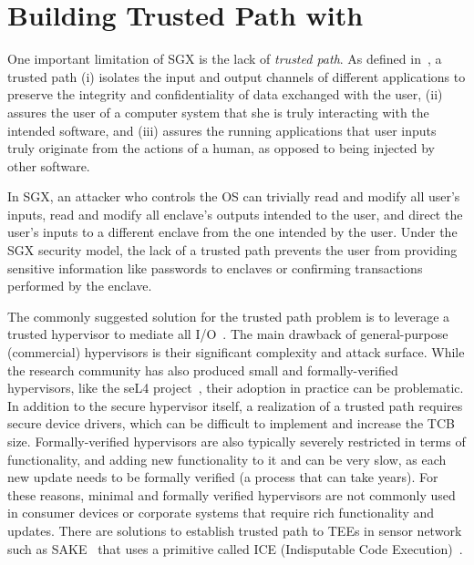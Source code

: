 \section{Building Trusted Path with \name}
\label{sec:secureInput}

 
One important limitation of SGX is the lack of \emph{trusted path}. As defined in~\cite{filyanov2011uni}, a trusted path (i) isolates the input and output channels of different applications to preserve the integrity and confidentiality of data exchanged with the user, (ii) assures the user of a computer system that she is truly interacting with the intended software, and (iii) assures the running applications that user inputs truly originate from the actions of a human, as opposed to being injected by other software.

In SGX, an attacker who controls the OS can trivially read and modify all user's inputs, read and modify all enclave's outputs intended to the user, and direct the user's inputs to a different enclave from the one intended by the user. Under the SGX security model, the lack of a trusted path prevents the user from providing sensitive information like passwords to enclaves or confirming transactions performed by the enclave.



The commonly suggested solution for the trusted path problem is to leverage a trusted hypervisor to mediate all I/O~\cite{weiser2017sgxio}. The main drawback of general-purpose (commercial) hypervisors is their significant complexity and attack surface. While the research community has also produced small and formally-verified hypervisors, like the seL4 project~\cite{klein2009sel4}, their adoption in practice can be problematic. In addition to the secure hypervisor itself, a realization of a trusted path requires secure device drivers, which can be difficult to implement and increase the TCB size. Formally-verified hypervisors are also typically severely restricted in terms of functionality, and adding new functionality to it and can be very slow, as each new update needs to be formally verified (a process that can take years). For these reasons, minimal and formally verified hypervisors are not commonly used in consumer devices or corporate systems that require rich functionality and updates. There are solutions to establish trusted path to TEEs in sensor network such as SAKE~\cite{seshadri2008sake} that uses a primitive called ICE (Indisputable Code Execution)~\cite{seshadri2006scuba}.

